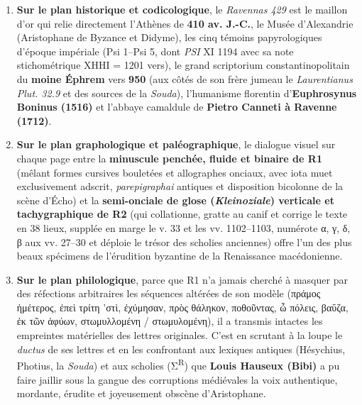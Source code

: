\documentclass[11pt, a4paper, twoside]{article}
\renewcommand{\_}{\origunderscore\penalty0\relax}
\renewcommand{\texttt}[1]{#1}
\newcommand{\Run}{\textbf{R}\textsuperscript{1}}
\newcommand{\Rdeux}{\textbf{R}\textsuperscript{2}}
\newcommand{\Bibi}{\textit{Bibi}}
\newcommand{\PsiUn}{\textgreek{Ψ}\textsuperscript{1}}
\newcommand{\PsiCinq}{\textgreek{Ψ}\textsuperscript{5}}
\def\Run{R1}%
\def\Rdeux{R2}%
\def\Bibi{Bibi}%
\def\PsiUn{Psi 1}%
\def\PsiCinq{Psi 5}%
\begin{document}
\begin{enumerate}[leftmargin=1.6em, itemsep=2pt]
  \item \textbf{Sur le plan historique et codicologique}, le \textit{Ravennas 429} est le maillon d'or qui relie directement l'Athènes de \textbf{410 av. J.-C.}, le Musée d'Alexandrie (Aristophane de Byzance et Didyme), les cinq témoins papyrologiques d'époque impériale (\PsiUn{}–\PsiCinq{}, dont \textit{PSI} XI 1194 avec sa note stichométrique \texttt{ΧΗΗΙ} = 1201 vers), le grand scriptorium constantinopolitain du \textbf{moine Éphrem} vers \textbf{950} (aux côtés de son frère jumeau le \textit{Laurentianus Plut. 32.9} et des sources de la \textit{Souda}), l'humanisme florentin d'\textbf{Euphrosynus Boninus (1516)} et l'abbaye camaldule de \textbf{Pietro Canneti à Ravenne (1712)}.
  \item \textbf{Sur le plan graphologique et paléographique}, le dialogue visuel sur chaque page entre la \textbf{minuscule penchée, fluide et binaire de \Run{}} (mêlant formes cursives bouletées et allographes onciaux, avec iota muet exclusivement adscrit, \textit{parepigraphai} antiques et disposition bicolonne de la scène d'Écho) et la \textbf{semi-onciale de glose (\textit{Kleinoziale}) verticale et tachygraphique de \Rdeux{}} (qui collationne, gratte au canif et corrige le texte en 38 lieux, supplée en marge le v. 33 et les vv. 1102–1103, numérote \texttt{α, γ, δ, β} aux vv. 27–30 et déploie le trésor des scholies anciennes) offre l'un des plus beaux spécimens de l'érudition byzantine de la Renaissance macédonienne.
  \item \textbf{Sur le plan philologique}, parce que \Run{} n'a jamais cherché à masquer par des réfections arbitraires les séquences altérées de son modèle (\texttt{πράμος ἡμέτερος}, \texttt{ἐπεὶ τρίτη 'στὶ}, \texttt{ἐχύμησαν}, \texttt{πρὸς θάληκον}, \texttt{ποθοῦντας}, \texttt{ὦ πόλεις}, \texttt{βαΰζα}, \texttt{ἐκ τῶν ἀφύων}, \texttt{στωμυλλομένη / στωμυλομένη}), il a transmis intactes les empreintes matérielles des lettres originales. C'est en scrutant à la loupe le \textit{ductus} de ses lettres et en les confrontant aux lexiques antiques (Hésychius, Photius, la \textit{Souda}) et aux scholies (Σ\textsuperscript{R}) que \textbf{Louis Hauseux (\Bibi{})} a pu faire jaillir sous la gangue des corruptions médiévales la voix authentique, mordante, érudite et joyeusement obscène d'Aristophane.
\end{enumerate}
\end{document}
